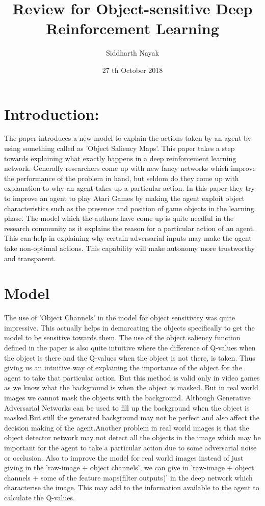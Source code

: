 \documentclass{article}
\title{Review for Object-sensitive Deep Reinforcement Learning}
\date{27 th October 2018}
\author{Siddharth Nayak }
\begin{document}
\maketitle
\newcommand{\norm}[1]{\left\lVert#1\right\rVert}


\section{Introduction:}
The paper introduces a new model to explain the actions taken by an agent by using something called as 'Object Saliency Maps'. This paper takes a step towards explaining what exactly happens in a deep reinforcement learning network. Generally researchers come up with new fancy networks which improve the performance of the problem in hand, but seldom do they come up with explanation to why an agent takes up a particular action. In this paper they try to improve an agent to play Atari Games by making the agent exploit object characteristics such as the presence and position of game objects in the learning phase. The model which the authors have come up is quite needful in the research community as it explains the reason for a particular action of an agent. This can help in  explaining why certain adversarial inputs may make the agent take non-optimal actions. This capability will make autonomy more trustworthy and transparent. 

\section{Model}
The use of 'Object Channels' in the model for object sensitivity was quite impressive. This actually helps in demarcating the objects specifically to get the model to be sensitive towards them. The use of the object saliency function defined in the paper is also quite intuitive where the difference of Q-values when the object is there and the Q-values when the object is not there, is taken. Thus giving us an intuitive way of explaining the importance of the object for the agent to take that particular action. But this method is valid only in video games as we know what the background is when the object is masked. But in real world images we cannot mask the objects with the background. Although Generative Adversarial Networks can be used to fill up the background when the object is masked.But still the generated background may not be perfect and also affect the decision making of the agent.Another problem in real world images is that the object detector network may not detect all the objects in the image which may be important for the agent to take a particular action due to some adversarial noise or occlusion. Also to improve the model for real world images instead of just giving in the 'raw-image + object channels', we can give in 'raw-image + object channels + some of the feature maps(filter outputs)' in the deep network which characterise the image. This may add to the information available to the agent to calculate the Q-values.
\end{document}
